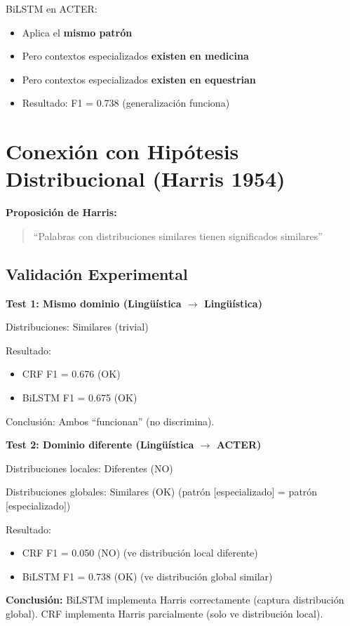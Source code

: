 BiLSTM en ACTER:
\begin{itemize}
    \item Aplica el \textbf{mismo patrón}
    \item Pero contextos especializados \textbf{existen en medicina}
    \item Pero contextos especializados \textbf{existen en equestrian}
    \item Resultado: F1 = 0.738 (generalización funciona)
\end{itemize}

\section{Conexión con Hipótesis Distribucional (Harris 1954)}

\textbf{Proposición de Harris:}
\begin{quote}
``Palabras con distribuciones similares tienen significados similares''
\end{quote}

\subsection{Validación Experimental}

\textbf{Test 1: Mismo dominio (Lingüística $\rightarrow$ Lingüística)}

Distribuciones: Similares (trivial)

Resultado:
\begin{itemize}
    \item CRF F1 = 0.676 (OK)
    \item BiLSTM F1 = 0.675 (OK)
\end{itemize}

Conclusión: Ambos ``funcionan'' (no discrimina).

\textbf{Test 2: Dominio diferente (Lingüística $\rightarrow$ ACTER)}

Distribuciones locales: Diferentes (NO)

Distribuciones globales: Similares (OK) (patrón [especializado] = patrón [especializado])

Resultado:
\begin{itemize}
    \item CRF F1 = 0.050 (NO) (ve distribución local diferente)
    \item BiLSTM F1 = 0.738 (OK) (ve distribución global similar)
\end{itemize}

\textbf{Conclusión:} BiLSTM implementa Harris correctamente (captura distribución global). CRF implementa Harris parcialmente (solo ve distribución local).

